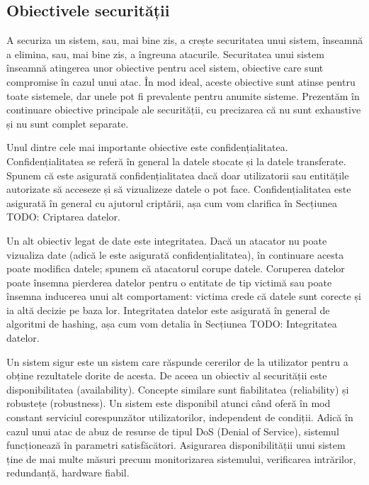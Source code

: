 \subsection{Obiectivele securității}
\label{sec:sec:objectives}

A securiza un sistem, sau, mai bine zis, a crește securitatea unui sistem, înseamnă a elimina, sau, mai bine zis, a îngreuna atacurile. Securitatea unui sistem înseamnă atingerea unor obiective pentru acel sistem, obiective care sunt compromise în cazul unui atac. În mod ideal, aceste obiective sunt atinse pentru toate sistemele, dar unele pot fi prevalente pentru anumite sisteme. Prezentăm în continuare obiective principale ale securității, cu precizarea că nu sunt exhaustive și nu sunt complet separate.

Unul dintre cele mai importante obiective este confidențialitatea. Confidențialitatea se referă în general la datele stocate și la datele transferate. Spunem că este asigurată confidențialitatea dacă doar utilizatorii sau entitățile autorizate să acceseze și să vizualizeze datele o pot face. Confidențialitatea este asigurată în general cu ajutorul criptării, așa cum vom clarifica în Secțiunea TODO: Criptarea datelor.

Un alt obiectiv legat de date este integritatea. Dacă un atacator nu poate vizualiza date (adică le este asigurată confidențialitatea), în continuare acesta poate modifica datele; spunem că atacatorul corupe datele. Coruperea datelor poate însemna pierderea datelor pentru o entitate de tip victimă sau poate însemna inducerea unui alt comportament: victima crede că datele sunt corecte și ia altă decizie pe baza lor. Integritatea datelor este asigurată în general de algoritmi de hashing, așa cum vom detalia în Secțiunea TODO: Integritatea datelor.

Un sistem sigur este un sistem care răspunde cererilor de la utilizator pentru a obține rezultatele dorite de acesta. De aceea un obiectiv al securității este disponibilitatea (availability). Concepte similare sunt fiabilitatea (reliability) și robustețe (robustness). Un sistem este disponibil atunci când oferă în mod constant serviciul corespunzător utilizatorilor, independent de condiții. Adică în cazul unui atac de abuz de resurse de tipul DoS (Denial of Service), sistemul funcționează în parametri satisfăcători. Asigurarea disponibilității unui sistem ține de mai multe măsuri precum monitorizarea sistemului, verificarea intrărilor, redundanță, hardware fiabil.

